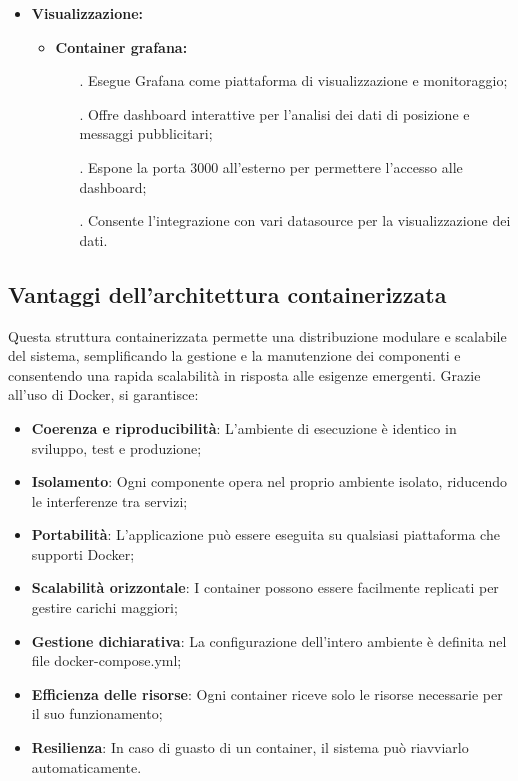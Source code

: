 \documentclass[10pt]{article}
\begin{document}
\begin{itemize}
    \item \textbf{Visualizzazione:}
    \begin{itemize}
        \item \textbf{Container grafana:}
        \begin{itemize}
            \item[.] Esegue Grafana come piattaforma di visualizzazione e monitoraggio;
            \item[.] Offre dashboard interattive per l'analisi dei dati di posizione e messaggi pubblicitari;
            \item[.] Espone la porta 3000 all'esterno per permettere l'accesso alle dashboard;
            \item[.] Consente l'integrazione con vari datasource per la visualizzazione dei dati.
        \end{itemize}
    \end{itemize}
\end{itemize}

\subsection{Vantaggi dell'architettura containerizzata}
Questa struttura containerizzata permette una distribuzione modulare e scalabile del sistema, semplificando la gestione e la manutenzione dei componenti e consentendo una rapida scalabilità in risposta alle esigenze emergenti. Grazie all'uso di Docker, si garantisce:

\begin{itemize}
    \item \textbf{Coerenza e riproducibilità}: L'ambiente di esecuzione è identico in sviluppo, test e produzione;
    \item \textbf{Isolamento}: Ogni componente opera nel proprio ambiente isolato, riducendo le interferenze tra servizi;
    \item \textbf{Portabilità}: L'applicazione può essere eseguita su qualsiasi piattaforma che supporti Docker;
    \item \textbf{Scalabilità orizzontale}: I container possono essere facilmente replicati per gestire carichi maggiori;
    \item \textbf{Gestione dichiarativa}: La configurazione dell'intero ambiente è definita nel file docker-compose.yml;
    \item \textbf{Efficienza delle risorse}: Ogni container riceve solo le risorse necessarie per il suo funzionamento;
    \item \textbf{Resilienza}: In caso di guasto di un container, il sistema può riavviarlo automaticamente.
\end{itemize}
\end{document}

